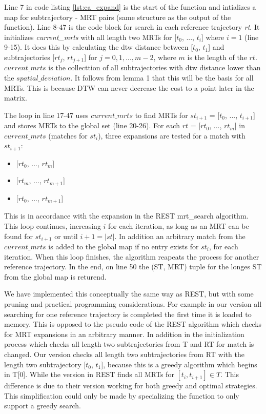Line 7 in code listing \ref{lst:ca_expand} is the start of the function and intializes a map for subtrajectory - MRT pairs (same structure as the output of the function). Line 8-47 is the code block for search in each reference trajectory \textit{rt}. It initializes \textit{current\_mrts} with all length two MRTs for [$t_0$, ..., $t_i$] where $i = 1$ (line 9-15). It does this by calculating the dtw distance between [$t_0$, $t_1$] and subtrajectories [$rt_j$, $rt_{j+1}$] for $j = 0, 1, ..., m-2$, where $m$ is the length of the $rt$. $current\_mrts$ is the collecttion of all subtrajectories with dtw distance lower than the $spatial\_deviation$. It follows from lemma 1 that this will be the basis for all MRTs. This is because DTW can never decrease the cost to a point later in the matrix.

The loop in line 17-47 uses $current\_mrts$ to find MRTs for $st_{i+1}$ = [$t_0$, ..., $t_{i+1}$] and stores MRTs to the global set (line 20-26). For each $rt$ = [$rt_0$, ..., $rt_m$] in $current\_mrts$ (matches for $st_i$), three expansions are tested for a match with $st_{i+1}$:
\begin{itemize}
    \item {[$rt_0$, ..., $rt_m$]}
    \item {[$rt_m$, ..., $rt_{m+1}$]}
    \item {[$rt_0$, ..., $rt_{m+1}$]}
\end{itemize}
This is in accordance with the expansion in the REST mrt\_search algorithm. This loop continues, increasing $i$ for each iteration, as long as an MRT can be found for $st_{i+1}$ or until $i+1 = |st|$. In addition an arbitrary match from the $current\_mrts$ is added to the global map if no entry exists for $st_{i}$, for each iteration. When this loop finishes, the algorithm reapeats the process for another reference trajectory. In the end, on line 50 the (ST, MRT) tuple for the longes ST from the global map is returend.

We have implemented this conceptually the same way as REST, but with some pruning and practical programming considerations. For example in our version all searching for one reference trajectory is completed the first time it is loaded to memory. This is opposed to the pseudo code of the REST algorithm which checks for MRT expansions in an arbitrary manner. In addition in the initialization process which checks all length two subtrajectories from T and RT for match is changed. Our version checks all length two subtrajectories from RT with the length two subtrajectory [$t_0$, $t_1$], because this is a greedy algorithm which begins in T[0]. While the version in REST finds all MRTs for $[t_i, t_{i+1}] \in T$. This difference is due to their version working for both greedy and optimal strategies. This simplification could only be made by specializing the function to only support a greedy search.


